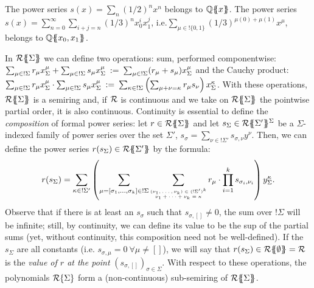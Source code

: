   \begin{example}
  The power series $s(x)=\sum_{n} (1/2)^n x^n$ belongs to ${\mathbb Q}\{\!\!\{x\}\!\!\}$.
  The power series $s(x)=\sum_{n=0 }^{\infty}\sum_{i+j=n} (1/3)^{n} x_0^{i}x_1^j$, i.e.$ \sum_{\mu\in !\{0,1\}}(1/3)^{\mu(0)+\mu(1)}x^{\mu}$, belongs to ${\mathbb Q}\{\!\!\{x_0,x_1\}\!\!\}$.
  \end{example}
 
 In ${\mathcal{R}}\{\!\!\{\Sigma\}\!\!\}$ we can define two operations: sum, performed componentwise: $\sum_{\mu \in !\Sigma} r_\mu x_\Sigma^{\mu} + \sum_{\mu \in !\Sigma} s_\mu x_\Sigma^{\mu} \: := \: \sum_{\mu \in !\Sigma} (r_\mu + s_\mu)  x_\Sigma^{\mu}$ and the Cauchy product: 
 $
 \sum_{\mu \in !\Sigma} r_\mu x_\Sigma^{\mu} \cdot \sum_{\mu \in !\Sigma} s_\mu x_\Sigma^{\mu} \: := \: \sum_{\kappa \in !\Sigma}\left (\sum_{\mu + \nu = \kappa} r_\mu s_\nu\right)  x_\Sigma^{\kappa}$.
 With these operations, ${\mathcal{R}}\{\!\!\{\Sigma\}\!\!\}$ is a semiring and, if $\mathcal{R}$ is continuous and we take on ${\mathcal{R}}\{\!\!\{\Sigma\}\!\!\}$ the pointwise partial order, it is also continuous.
 Continuity is essential to define the \textit{composition} of formal power series: let $r \in {\mathcal{R}}\{\!\!\{\Sigma\}\!\!\}$ and let $s_\Sigma\in {\mathcal{R}}\{\!\!\{\Sigma'\}\!\!\}^{\Sigma}$ be a $\Sigma$-indexed family of power series over the set $\Sigma'$, $s_\sigma = \sum_{\nu \in !\Sigma'}s_{\sigma, \nu} y^\nu$. Then, we can define the power series $r(s_\Sigma) \in {\mathcal{R}}\{\!\!\{\Sigma'\}\!\!\}$ by the formula:
   \begin{align*}
   r(s_\Sigma)=
\sum_{\kappa \in ! \Sigma'}  \left( \sum_{\mu=[\sigma_1, \dots, \sigma_k] \in !\Sigma} \sum_{
{\tiny
\begin{matrix}
(\nu_1,\dots,\nu_{k})\in (!\Sigma')^k\\
\nu_1+\dots+\nu_{k}=\kappa
\end{matrix}
}
}
r_{\mu }\cdot 
 \prod_{i=1}^{k}  s_{\sigma_i, \nu_i } \right)y_\Sigma^\kappa.
  \end{align*}
  Observe that if there is at least an $s_\sigma$ such that $s_{\sigma, []} \neq 0$, the sum over $!\Sigma$ will be infinite; still, by continuity, we can define its value to be the sup of the partial sums (yet, without continuity, this composition need not be well-defined). If the $s_\Sigma$ are all constants (i.e. $s_{\sigma, \mu}=0 \: \forall \mu \neq []$), we will say that $r(s_\Sigma) \in {\mathcal{R}}\{\!\!\{\emptyset\}\!\!\}= \mathcal{R}$ is the \emph{value of $r$ at the point} $(s_{\sigma, []})_{\sigma \in \Sigma}$.
With respect to these operations, the polynomials ${\mathcal{R}}\{\Sigma\}$ form a (non-continuous) sub-semiring of ${\mathcal{R}}\{\!\!\{\Sigma\}\!\!\}$. 
  
